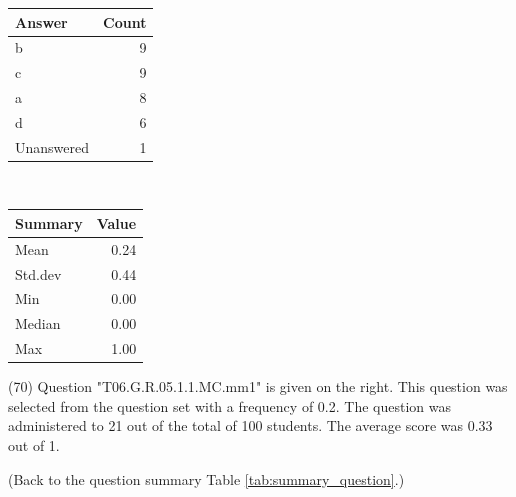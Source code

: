 \documentclass[12pt,nohyper]{tufte-handout}\usepackage[]{graphicx}\usepackage[]{color}
\begin{document}
\begin{center}%
\begin{tabular}{lr}
  \hline
Answer & Count \\ 
  \hline
b &   9 \\ 
  c &   9 \\ 
  a &   8 \\ 
  d &   6 \\ 
  Unanswered &   1 \\ 
   \hline
\end{tabular}
~~~~~~~~%
\begin{tabular}{lr}
  \hline
Summary & Value \\ 
  \hline
Mean & 0.24 \\ 
  Std.dev & 0.44 \\ 
  Min & 0.00 \\ 
  Median & 0.00 \\ 
  Max & 1.00 \\ 
   \hline
\end{tabular}
\end{center}\newpage{} (70) Question "T06.G.R.05.1.1.MC.mm1" is given on the right. This question was selected from the question set with a frequency of 0.2. The question was administered to 21 out of the total of 100 students. The average score was 0.33 out of 1.

 (Back to the question summary Table \ref{tab:summary_question}.)
\end{document}
